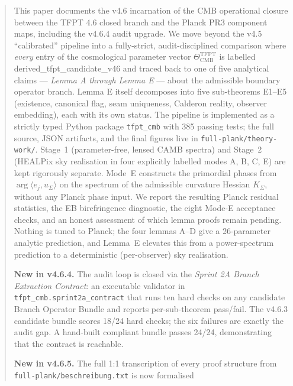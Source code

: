 
\maketitle

\begin{abstract}
This paper documents the v4.6 incarnation of the CMB operational
closure between the TFPT 4.6 closed branch and the Planck PR3 component
maps, including the v4.6.4 audit upgrade.  We move beyond the v4.5
``calibrated'' pipeline into a fully-strict, audit-disciplined
comparison where \emph{every} entry of the cosmological parameter
vector \(\Theta_{\mathrm{CMB}}^{\mathrm{TFPT}}\) is labelled
\textsf{derived\_tfpt\_candidate\_v46} and traced back to one of five
analytical claims --- \emph{Lemma A through Lemma E} --- about the
admissible boundary operator branch.  Lemma E itself decomposes into
five sub-theorems E1--E5 (existence, canonical flag, seam uniqueness,
Calderon reality, observer embedding), each with its own status.  The
pipeline is implemented as a strictly typed Python package
\texttt{tfpt\_cmb} with 385 passing tests; the full source, JSON
artifacts, and the final figures live in
\texttt{full-plank/theory-work/}.  Stage~1 (parameter-free, lensed CAMB
spectra) and Stage~2 (HEALPix sky realisation in four explicitly
labelled modes A, B, C, E) are kept rigorously separate.  Mode~E
constructs the primordial phases from
\(\arg\langle e_j,u_\Sigma\rangle\) on the spectrum of the admissible
curvature Hessian \(K_\Sigma\), without any Planck phase input.  We
report the resulting Planck residual statistics, the EB birefringence
diagnostic, the eight Mode-E acceptance checks, and an honest
assessment of which lemma proofs remain pending.  Nothing is tuned to
Planck; the four lemmas A--D give a 26-parameter analytic prediction,
and Lemma~E elevates this from a power-spectrum prediction to a
deterministic (per-observer) sky realisation.\par
\textbf{New in v4.6.4.}  The audit loop is closed via the
\emph{Sprint 2A Branch Extraction Contract}: an executable validator
in \texttt{tfpt\_cmb.sprint2a\_contract} that runs ten hard checks on
any candidate Branch Operator Bundle and reports per-sub-theorem
pass/fail.  The v4.6.3 candidate bundle scores 18/24 hard checks;
the six failures are exactly the audit gap.  A hand-built compliant
bundle passes 24/24, demonstrating that the contract is reachable.
\par
\textbf{New in v4.6.5.}  The full 1:1 transcription of every proof
structure from \texttt{full-plank/beschreibung.txt} is now formalised

\end{abstract}

